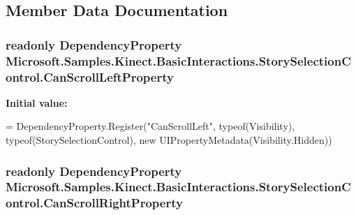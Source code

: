 \subsection{Member Data Documentation}
\hypertarget{class_microsoft_1_1_samples_1_1_kinect_1_1_basic_interactions_1_1_story_selection_control_a3e925c601043f34785732429cc0c5a9d}{
\subsubsection[{Can\-Scroll\-Left\-Property}]{\setlength{\rightskip}{0pt plus 5cm}readonly Dependency\-Property Microsoft.\-Samples.\-Kinect.\-Basic\-Interactions.\-Story\-Selection\-Control.\-Can\-Scroll\-Left\-Property\hspace{0.3cm}{\ttfamily [static]}}}\label{class_microsoft_1_1_samples_1_1_kinect_1_1_basic_interactions_1_1_story_selection_control_a3e925c601043f34785732429cc0c5a9d}
{\bfseries Initial value\-:}
\begin{DoxyCode}
=
            DependencyProperty.Register(\textcolor{stringliteral}{"CanScrollLeft"}, typeof(Visibility), typeof(StorySelectionControl),
       \textcolor{keyword}{new} UIPropertyMetadata(Visibility.Hidden))
\end{DoxyCode}
\hypertarget{class_microsoft_1_1_samples_1_1_kinect_1_1_basic_interactions_1_1_story_selection_control_a821a3521f5503518dea4624df007f21a}{
\subsubsection[{Can\-Scroll\-Right\-Property}]{\setlength{\rightskip}{0pt plus 5cm}readonly Dependency\-Property Microsoft.\-Samples.\-Kinect.\-Basic\-Interactions.\-Story\-Selection\-Control.\-Can\-Scroll\-Right\-Property\hspace{0.3cm}{\ttfamily [static]}}}\label{class_microsoft_1_1_samples_1_1_kinect_1_1_basic_interactions_1_1_story_selection_control_a821a3521f5503518dea4624df007f21a}
